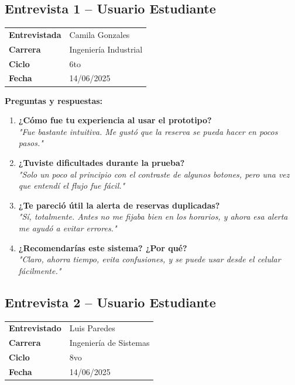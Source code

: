 \documentclass{article}
\begin{document}
\subsection{Entrevista 1 \texorpdfstring{--}{--} Usuario Estudiante}
\begin{table}[h]
\centering
\begin{tabular}{|l|l|}
\hline
\textbf{Entrevistada} & Camila Gonzales \\ 
\textbf{Carrera} & Ingeniería Industrial \\ 
\textbf{Ciclo} & 6to \\ 
\textbf{Fecha} & 14/06/2025 \\ 
\hline
\end{tabular}
\end{table}
\newpage
\textbf{Preguntas y respuestas:}
\begin{enumerate}
    \item \textbf{¿Cómo fue tu experiencia al usar el prototipo?} \\ 
    \textit{"Fue bastante intuitiva. Me gustó que la reserva se pueda hacer en pocos pasos."}
    
    \item \textbf{¿Tuviste dificultades durante la prueba?} \\ 
    \textit{"Solo un poco al principio con el contraste de algunos botones, pero una vez que entendí el flujo fue fácil."}
    
    \item \textbf{¿Te pareció útil la alerta de reservas duplicadas?} \\ 
    \textit{"Sí, totalmente. Antes no me fijaba bien en los horarios, y ahora esa alerta me ayudó a evitar errores."}
    
    \item \textbf{¿Recomendarías este sistema? ¿Por qué?} \\ 
    \textit{"Claro, ahorra tiempo, evita confusiones, y se puede usar desde el celular fácilmente."}
\end{enumerate}

\subsection{Entrevista 2 – Usuario Estudiante}
\begin{table}[h]
\centering
\begin{tabular}{|l|l|}
\hline
\textbf{Entrevistado} & Luis Paredes \\ 
\textbf{Carrera} & Ingeniería de Sistemas \\ 
\textbf{Ciclo} & 8vo \\ 
\textbf{Fecha} & 14/06/2025 \\ 
\hline
\end{tabular}
\end{table}
\end{document}
